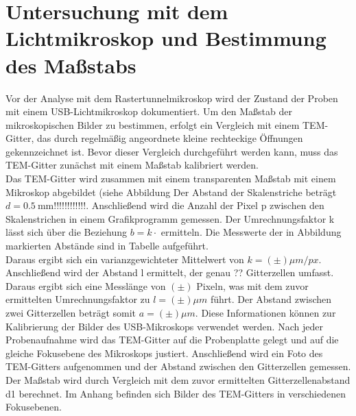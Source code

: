 \chapter{Untersuchung mit dem Lichtmikroskop und Bestimmung des Maßstabs}
Vor der Analyse mit dem Rastertunnelmikroskop wird der Zustand der Proben mit einem USB-Lichtmikroskop dokumentiert. Um den Maßstab der mikroskopischen Bilder zu bestimmen, erfolgt ein Vergleich mit einem TEM-Gitter, das durch regelmäßig angeordnete kleine rechteckige Öffnungen gekennzeichnet ist. Bevor dieser Vergleich durchgeführt werden kann, muss das TEM-Gitter zunächst mit einem Maßstab kalibriert werden.\\

Das TEM-Gitter wird zusammen mit einem transparenten Maßstab mit einem Mikroskop abgebildet (siehe Abbildung %
Der Abstand der Skalenstriche beträgt $d = \SI{0.5}{\milli\meter} !!!!!!!!!!!!$. %
Anschließend wird die Anzahl der Pixel p zwischen den Skalenstrichen in einem Grafikprogramm gemessen. Der Umrechnungsfaktor k lässt sich über die Beziehung $b = k\cdotp$ ermitteln. Die Messwerte der in Abbildung %
markierten Abstände sind in Tabelle %
aufgeführt.\\ %

Daraus ergibt sich ein varianzgewichteter Mittelwert von $k = ( \pm ) \mu m/px$. Anschließend wird der Abstand l ermittelt, der genau ?? Gitterzellen umfasst. Daraus ergibt sich eine Messlänge von $(\pm)$ Pixeln, was mit dem zuvor ermittelten Umrechnungsfaktor zu $l = (\pm) \mu m$ führt. Der Abstand zwischen zwei Gitterzellen beträgt somit $a = (\pm) \mu m$.
Diese Informationen können zur Kalibrierung der Bilder des USB-Mikroskops verwendet werden. Nach jeder Probenaufnahme wird das TEM-Gitter auf die Probenplatte gelegt und auf die gleiche Fokusebene des Mikroskops justiert. Anschließend wird ein Foto des TEM-Gitters aufgenommen und der Abstand zwischen den Gitterzellen gemessen. Der Maßstab wird durch Vergleich mit dem zuvor ermittelten Gitterzellenabstand d1 berechnet. Im Anhang befinden sich Bilder des TEM-Gitters in verschiedenen Fokusebenen.